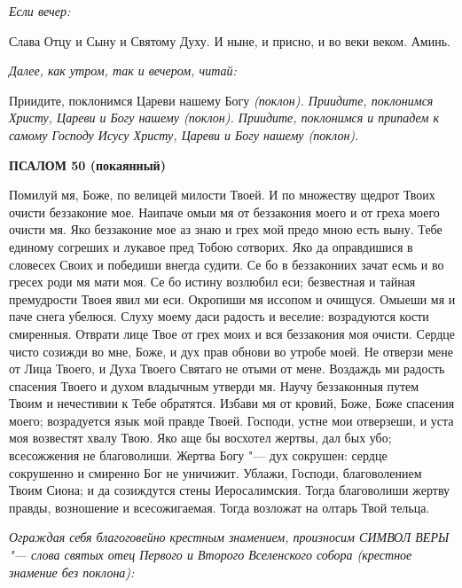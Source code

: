 \itshape Если вечер:\normalfont{}


Слава Отцу и Сыну и Святому Духу. И ныне, и присно, и во веки веком. Аминь.


\itshape Далее, как утром, так и вечером, читай:\normalfont{}


Приидите, поклонимся Цареви нашему Богу \itshape (поклон)\normalfont{}. Приидите, поклонимся Христу, Цареви и Богу нашему \itshape (поклон)\normalfont{}. Приидите, поклонимся и припадем к самому Господу Исусу Христу, Цареви и Богу нашему \itshape (поклон)\normalfont{}.





\bfseries ПСАЛОМ 50 (покаянный)\normalfont{}


Помилуй мя, Боже, по велицей милости Твоей. И по множеству щедрот Твоих очисти беззаконие мое. Наипаче омыи мя от беззакония моего и от греха моего очисти мя. Яко беззаконие мое аз знаю и грех мой предо мною есть выну. Тебе единому согреших и лукавое пред Тобою сотворих. Яко да оправдишися в словесех Своих и победиши внегда судити. Се бо в беззакониих зачат есмь и во гресех роди мя мати моя. Се бо истину возлюбил еси; безвестная и тайная премудрости Твоея явил ми еси. Окропиши мя иссопом и очищуся. Омыеши мя и паче снега убелюся. Слуху моему даси радость и веселие: возрадуются кости смиренныя. Отврати лице Твое от грех моих и вся беззакония моя очисти. Сердце чисто созижди во мне, Боже, и дух прав обнови во утробе моей. Не отверзи мене от Лица Твоего, и Духа Твоего Святаго не отыми от мене. Воздаждь ми радость спасения Твоего и духом владычным утверди мя. Научу беззаконныя путем Твоим и нечестивии к Тебе обратятся. Избави мя от кровий, Боже, Боже спасения моего; возрадуется язык мой правде Твоей. Господи, устне мои отверзеши, и уста моя возвестят хвалу Твою. Яко аще бы восхотел жертвы, дал бых убо; всесожжения не благоволиши. Жертва Богу "--- дух сокрушен: сердце сокрушенно и смиренно Бог не уничижит. Ублажи, Господи, благоволением Твоим Сиона; и да созиждутся стены Иеросалимския. Тогда благоволиши жертву правды, возношение и всесожигаемая. Тогда возложат на олтарь Твой тельца.


\itshape Ограждая себя благоговейно крестным знамением, произносим СИМВОЛ ВЕРЫ "--- слова святых отец Первого и Второго Вселенского собора (крестное знамение без поклона):\normalfont{}


